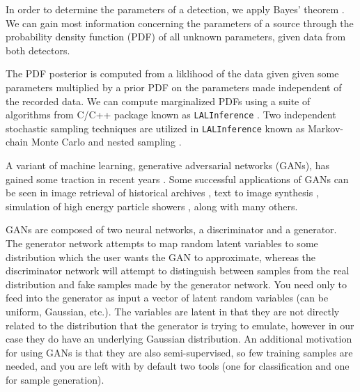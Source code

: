 \documentclass[%
showpacs,
 amsmath,amssymb,
 aps,
 twocolumn,
 prl,
 reprint,
floatfix,
]{revtex4-1}
\begin{document}
%
%
In order to determine the parameters of a detection, we apply Bayes' theorem \cite{Bayes and R. Price, Phil. Trans. R. Soc. London 53, 370 (1763). E. T. Jaynes, Probability Theory: The Logic of Science, edited by G. L. Bretthorst (Cambridge University Press, Cambridge, England, 2003).}. We can gain most information concerning the parameters of a source through the probability density function (PDF) of all unknown parameters, given data from both detectors. 

The PDF posterior is computed from a liklihood of the data given given some parameters multiplied by a prior PDF on  the parameters made independent of the recorded data. We can compute marginalized PDFs using a suite of algorithms from C/C++ package known as \texttt{LALInference} \cite{LALSuite}. Two independent stochastic sampling techniques are utilized in \texttt{LALInference} known as Markov-chain Monte Carlo \cite{MCMC paper} and nested sampling \cite{nested sampling}.

   

%
%
A variant of machine learning, generative adversarial networks (GANs), has gained some traction in recent years \cite{arxiv:1406.2661}. Some successful applications of GANs can be seen in image retrieval of historical archives \cite{arxiv:1607.02748}, text to image synthesis \cite{arxiv:1605.05396}, simulation of high energy particle showers \cite{arxiv:1712.10321}, along with many others. 

GANs are composed of two neural networks, a discriminator and a generator. The generator network attempts to map random latent variables to some distribution which the user wants the GAN to approximate, whereas the discriminator network will attempt to distinguish between samples from the real distribution and fake samples made by the generator network. You need only to feed into the generator as input a vector of latent random variables (can be uniform, Gaussian, etc.). The variables are latent in that they are not directly related to the distribution that the generator is trying to emulate, however in our case they do have an underlying Gaussian distribution. An additional motivation for using GANs is that they are also semi-supervised, so few training samples are needed, and you are left with by default two tools (one for classification and one for sample generation).  
\end{document}
